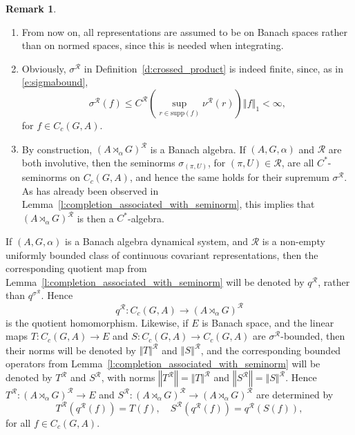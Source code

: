 \documentclass{amsart}
\theoremstyle{plain}
\theoremstyle{definition}
\newtheorem{remark}[theorem]{Remark}
\numberwithin{equation}{section}
\begin{document}
\begin{remark}\label{r:seminorm_remark}\quad
\begin{enumerate}
\item From now on, all representations are assumed to be on Banach spaces rather than on normed spaces, since this is needed when integrating.
\item
Obviously, ${\sigma^{\mathcal R}}$ in Definition~\ref{d:crossed_product} is indeed finite, since, as in \eqref{e:sigmabound},
\[
{\sigma^{\mathcal R}}(f) \leq {{C^{\mathcal R}}} \left( \sup_{r\in{\text{supp}}(f)} {\nu^{\mathcal R}}(r)\right){\left\Vert {f} \right\Vert}_1 < \infty,
\]
for $f\in C_c(G,A)$.
\item By construction, ${(A {\rtimes}_\alpha G)^\mathcal{R}}$ is a Banach algebra. If ${(A,G,\alpha)}$ and $\mathcal R$ are both involutive, then the seminorms $\sigma_{(\pi,U)}$, for ${(\pi,U)}\in{\mathcal R}$, are all $C^*$-seminorms on $C_c(G,A)$, and hence the same holds for their supremum ${\sigma^{\mathcal R}}$. As has already been observed in Lemma~\ref{l:completion_associated_with_seminorm}, this implies that ${(A {\rtimes}_\alpha G)^\mathcal{R}}$ is then a $C^*$-algebra.
\end{enumerate}
\end{remark}

If ${(A,G,\alpha)}$ is a Banach algebra dynamical system, and ${\mathcal R}$ is a non-empty uniformly bounded class of continuous covariant representations, then the corresponding quotient map from Lemma~\ref{l:completion_associated_with_seminorm} will be denoted by ${q^{\mathcal R}}$, rather than $q^{\sigma^{\mathcal R}}$. Hence
\[
{q^{\mathcal R}}: C_c(G,A)\to{(A {\rtimes}_\alpha G)^\mathcal{R}}
\]
is the quotient homomorphism. Likewise, if $E$ is Banach space, and the linear maps $T: C_c(G,A) \to E$ and $S: C_c(G,A) \to C_c(G,A)$ are ${\sigma^{\mathcal R}}$-bounded, then their norms will be denoted by $\Vert T \Vert^{\mathcal R}$ and ${\left\Vert {S} \right\Vert}^{\mathcal R}$, and the corresponding bounded operators from Lemma~\ref{l:completion_associated_with_seminorm} will be denoted by $T^{\mathcal R}$ and $S^{\mathcal R}$, with norms ${\left\Vert {T^{\mathcal R}} \right\Vert} = \Vert T\Vert^{\mathcal R}$ and ${\left\Vert {S^{\mathcal R}} \right\Vert} = \Vert S \Vert^{\mathcal R}$. Hence $T^{\mathcal R}:{(A {\rtimes}_\alpha G)^\mathcal{R}}\to E$ and $S^{\mathcal R}: {(A {\rtimes}_\alpha G)^\mathcal{R}} \to {(A {\rtimes}_\alpha G)^\mathcal{R}}$ are determined by
\begin{equation}\label{e:Tr_definition}
T^{\mathcal R}({q^{\mathcal R}}(f))=T(f), \quad S^{\mathcal R}({q^{\mathcal R}}(f)) = {q^{\mathcal R}}(S(f)),
\end{equation}
for all $f\in C_c(G,A)$.
\end{document}
